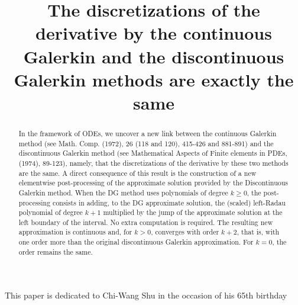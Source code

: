 \documentclass[bpam,reqno]{ipart}
\begin{document}
\begin{frontmatter}

\title[The DG and CG discretizations of the derivative coincide]{The discretizations of the derivative by the continuous Galerkin and the discontinuous Galerkin methods are
exactly the same}

\begin{aug}
    \author{ }
    \address{School of Mathematics, University of Minnesota, MN 55455\\
             USA\\
             }
\end{aug}
%

\begin{abstract}
In the framework of ODEs, 
we uncover a new  link between the 
continuous Galerkin method (see Math. Comp. (1972), 26 (118 and 120), 415-426 and 881-891) and the discontinuous Galerkin method (see Mathematical Aspects of Finite elements in PDEs, (1974), 89-123), namely, that the discretizations of the derivative by these two methods are the same. A direct consequence of this result is the construction of a new elementwise post-processing of the approximate solution provided by the Discontinuous Galerkin method. 
When the DG method uses polynomials of degree $k\ge0$, the post-processing consists in adding, to the DG approximate solution, the (scaled) left-Radau polynomial of 
degree $k+1$ multiplied by the jump of the approximate solution at the left boundary of the interval. No extra computation is required. The resulting new approximation is continuous and, for  $k>0$,
converges with order $k+2$, that is, with one order more than the original discontinuous Galerkin approximation. For $k=0$, the  order remains the same.
\end{abstract}

\begin{keyword}[class=MSC]
\end{keyword}

\begin{keyword}
\end{keyword}

\centerline{\small This paper is dedicated to Chi-Wang Shu in the occasion of his 65th birthday} 

\end{frontmatter}
\end{document}
